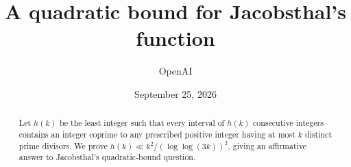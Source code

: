 \documentclass[11pt]{article}
\title{A quadratic bound for Jacobsthal's function}
\author{OpenAI}
\date{September 25, 2026}
\numberwithin{equation}{section}
\theoremstyle{definition}
\theoremstyle{remark}
\newcommand{\1}{\mathbf 1}
\begin{document}
\maketitle
\begin{abstract}
Let $h(k)$ be the least integer such that every interval of $h(k)$
consecutive integers contains an integer coprime to any prescribed
positive integer having at most $k$ distinct prime divisors. We prove
$h(k)\ll k^2/(\log\log(3k))^2$, giving an affirmative answer to
Jacobsthal's quadratic-bound question.
\end{abstract}
\tableofcontents











\appendix



\let\originalthebibliography\thebibliography
\renewcommand{\thebibliography}[1]{%
  \originalthebibliography{#1}%
  \addcontentsline{toc}{section}{\refname}}

\end{document}
